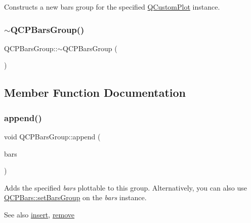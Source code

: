Constructs a new bars group for the specified \mbox{\hyperlink{class_q_custom_plot}{Q\+Custom\+Plot}} instance. \mbox{\label{class_q_c_p_bars_group_adb9475bcb6a5f18c8918e17d939d8dbd}} 
\subsubsection{\texorpdfstring{$\sim$QCPBarsGroup()}{~QCPBarsGroup()}}
{\footnotesize\ttfamily Q\+C\+P\+Bars\+Group\+::$\sim$\+Q\+C\+P\+Bars\+Group (\begin{DoxyParamCaption}{ }\end{DoxyParamCaption})\hspace{0.3cm}{\ttfamily [virtual]}}



\subsection{Member Function Documentation}
\mbox{\label{class_q_c_p_bars_group_a809ed63cc4ff7cd5b0b8c96b470163d3}} 
\subsubsection{\texorpdfstring{append()}{append()}}
{\footnotesize\ttfamily void Q\+C\+P\+Bars\+Group\+::append (\begin{DoxyParamCaption}\item[{\mbox{\hyperlink{class_q_c_p_bars}{Q\+C\+P\+Bars}} $\ast$}]{bars }\end{DoxyParamCaption})}

Adds the specified {\itshape bars} plottable to this group. Alternatively, you can also use \mbox{\hyperlink{class_q_c_p_bars_aedd1709061f0b307c47ddb45e172ef9a}{Q\+C\+P\+Bars\+::set\+Bars\+Group}} on the {\itshape bars} instance.

\begin{DoxySeeAlso}{See also}
\mbox{\hyperlink{class_q_c_p_bars_group_a309a5f7233db189f3ea9c2d04ece6c13}{insert}}, \mbox{\hyperlink{class_q_c_p_bars_group_a215e28a5944f1159013a0e19169220e7}{remove}} 
\end{DoxySeeAlso}
\mbox{\label{class_q_c_p_bars_group_a6e4f4e86abbec6a9342f204ef82abef8}} 

